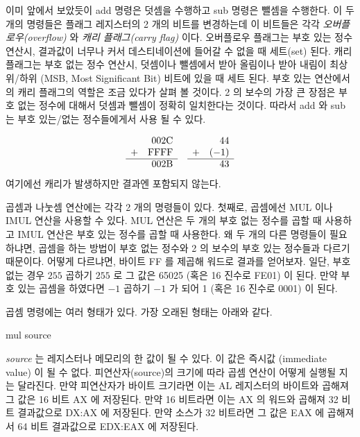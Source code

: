 이미 앞에서 보았듯이 {\code add} 명령은 덧셈을 수행하고 {\code sub} 명령은 뺄셈을
수행한다. 이 두 개의 명령들은 플래그 레지스터의 2 개의 비트를 변경하는데 이 비트들은
각각 \emph{오버플로우(overflow)} 와 \emph{캐리 플래그(carry flag)} 이다. 
오버플로우 플래그는 부호 있는 정수 연산시, 결과값이 너무나 커서 데스티네이션에 
들어갈 수 없을 때 세트(set) 된다. 캐리 플래그는 부호 없는 정수 연산시, 덧셈이나 뺄셈에서 받아 올림이나
받아 내림이 최상위/하위 (MSB, Most Significant Bit) 비트에 있을 때 세트 된다. 부호 있는
연산에서의 캐리 플래그의 역할은 조금 있다가 살펴 볼 것이다. 2 의 보수의 가장 큰
장점은 부호 없는 정수에 대해서 덧셈과 뺄셈이 정확히 일치한다는 것이다. 따라서 
{\code add} 와 {\code sub} 는 부호 있는/없는 정수들에게서 사용 될 수 있다. 

\[
\begin{array}{rrcrr}
 & 002\mathrm{C} & & & 44\\
+& \mathrm{FFFF} & &+&(-1)\\ \cline{1-2} \cline{4-5}
 & 002\mathrm{B} & & & 43
\end{array}
\]
여기에선 캐리가 발생하지만 결과엔 포함되지 않는다. 

곱셈과 나눗셈 연산에는 각각 2 개의 명령들이 있다. 첫째로, 곱셈에선 {\code MUL}
이나 {\code IMUL} 연산을 사용할 수 있다. {\code MUL} 연산은 두 개의 부호 없는
정수를 곱할 때 사용하고 {\code IMUL} 연산은 부호 있는 정수를 곱할 때 사용한다.
왜 두 개의 다른 명령들이 필요하냐면, 곱셈을 하는 방법이 부호 없는 정수와
2 의 보수의 부호 있는 정수들과 다르기 때문이다. 어떻게 다르냐면, 바이트 FF 를
제곱해 워드로 결과를 얻어보자. 일단, 부호 없는 경우 $255$ 곱하기 $255$ 로 
그 값은 65025 (혹은 16 진수로 FE01) 이 된다. 만약 부호 있는 곱셈을 하였다면
$-1$ 곱하기 $-1$ 가 되어 1 (혹은 16 진수로 0001) 이 된다. 

곱셈 명령에는 여러 형태가 있다. 가장 오래된 형태는 아래와 같다. 

\begin{AsmCodeListing}[numbers=none,frame=none]
      mul   source
\end{AsmCodeListing}
\emph{source} 는 레지스터나 메모리의 한 값이 될 수 있다. 이 값은 즉시값 
(immediate value) 이 될 수 없다. 피연산자(source)의 크기에 따라 곱셈
연산이 어떻게 실행될 지는 달라진다. 만약 피연산자가 바이트 크기라면 
이는 AL 레지스터의 바이트와 곱해져 그 값은 16 비트 AX 에 저장된다. 만약
16 비트라면 이는 AX 의 워드와 곱해져 32 비트 결과값으로 DX:AX 에 저장된다.
만약 소스가 32 비트라면 그 값은 EAX 에 곱해져서 64 비트 결과값으로 
EDX:EAX  에 저장된다. 

